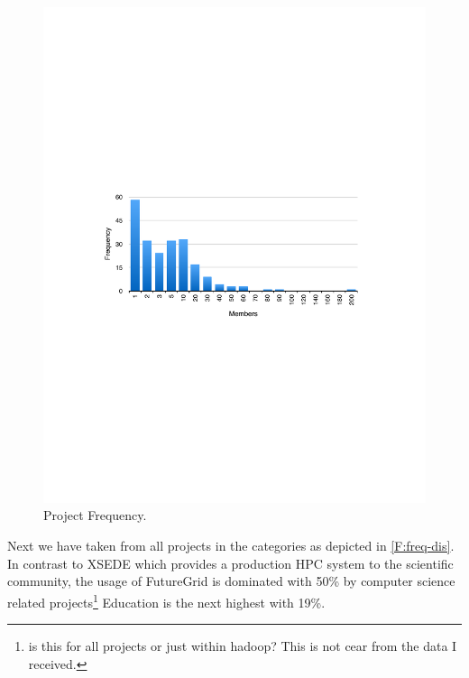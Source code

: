 \begin{figure}[htb]
 \centering
    \includegraphics[width=1.0\textwidth]{images/project-frequency.pdf}
  \caption{Project Frequency.}\label{F:project-members}
\end{figure}



Next we have taken from all projects in the categories as depicted in
\ref{F:freq-dis}. In contrast to XSEDE which provides a production HPC
system to the scientific community, the usage of FutureGrid is
dominated with 50\% by computer science related projects\footnote{is
  this for all projects or just within hadoop? This is not cear from
  the data I received.} Education is the next highest with 19\%.

